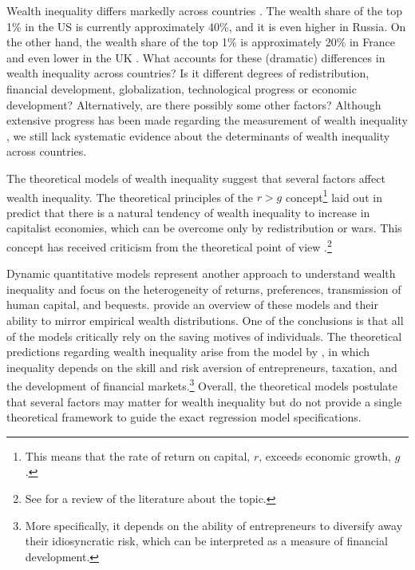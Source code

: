 \begin{refsection}
Wealth inequality differs markedly across countries \parencite{daviesetal2011,daviesetal2017,milanovic2016global}. The wealth share of the top 1\% in the US is currently approximately 40\%, and it is even higher in Russia. On the other hand, the wealth share of the top 1\% is approximately 20\% in France and even lower in the UK \parencite{zucman2019}. What accounts for these (dramatic) differences in wealth inequality across countries? Is it different degrees of redistribution, financial development, globalization, technological progress or economic development? Alternatively, are there possibly some other factors? Although extensive progress has been made regarding the measurement of wealth inequality  \parencite{alvaredoetal2013,daviesetal2011,daviesetal2017,pikettyandzucman2014,SaezZucman2016}, we still lack systematic evidence about the determinants of wealth inequality across countries.

The theoretical models of wealth inequality suggest that several factors affect wealth inequality. The theoretical principles of the $r > g$ concept\footnote{This means that the rate of return on capital, $r$, exceeds economic growth, $g$.} laid out in \textcite{piketty2014} predict that there is a natural tendency of wealth inequality to increase in capitalist economies, which can be overcome only by redistribution or wars. This concept has received criticism from the theoretical point of view \parencite{blume2015capital,mankiw2015yes}.\footnote{See \textcite{king2017literature} for a review of the literature about the topic.} 

Dynamic quantitative models represent another approach to understand wealth inequality and focus on the heterogeneity of returns, preferences, transmission of human capital, and bequests. \textcite{DENARDI2017280} provide an overview of these models and their ability to mirror empirical wealth distributions. One of the conclusions is that all of the models critically rely on the saving motives of individuals. The theoretical predictions regarding wealth inequality arise from the model by \textcite{pastor2016income}, in which inequality depends on the skill and risk aversion of entrepreneurs, taxation, and the development of financial markets.\footnote{More specifically, it depends on the ability of entrepreneurs to diversify away their idiosyncratic risk, which can be interpreted as a measure of financial development.} Overall, the theoretical models postulate that several factors may matter for wealth inequality but do not provide a single theoretical framework to guide the exact regression model specifications. 


\end{refsection}
